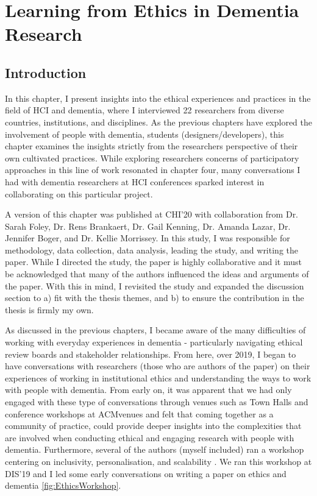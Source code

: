 \chapter{Learning from Ethics in Dementia Research}
\label{EthicsChapter}

\section{Introduction}
\label{Ethics:Intro}
In this chapter, I present insights into the ethical experiences and practices in the field of HCI and dementia, where I interviewed 22 researchers from diverse countries, institutions, and disciplines. As the previous chapters have explored the involvement of people with dementia, students (designers/developers), this chapter examines the insights strictly from the researchers perspective of their own cultivated practices. While exploring researchers concerns of participatory approaches in this line of work resonated in chapter four, many conversations I had with dementia researchers at HCI conferences sparked interest in collaborating on this particular project. 

A version of this chapter was published at CHI'20 \citep{hodge_relational_2020} with collaboration from  Dr. Sarah Foley, Dr. Rens Brankaert, Dr. Gail Kenning, Dr. Amanda Lazar, Dr. Jennifer Boger, and Dr. Kellie Morrissey. In this study, I was responsible for methodology, data collection, data analysis, leading the study, and writing the paper. While I directed the study, the paper is highly collaborative and it must be acknowledged that many of the authors influenced the ideas and arguments of the paper. With this in mind, I revisited the study and expanded the discussion section to a) fit with the thesis themes, and b) to ensure the contribution in the thesis is firmly my own.

As discussed in the previous chapters, I became aware of the many difficulties of working with everyday experiences in dementia - particularly navigating ethical review boards and stakeholder relationships. From here, over 2019, I began to have  conversations with researchers (those who are authors of the paper) on their experiences of working in institutional ethics and understanding the ways to work with people with dementia. From early on, it was apparent that we had only engaged with these type of conversations through venues such as Town Halls \citep{munteanu_sigchi_2019,bruckman_cscw_2017,frauenberger_research_2017} and conference workshops at ACMvenues \citep{waycott_ethical_2015,lazar_hcixdementia_2018} and felt that coming together as a community of practice, could provide deeper insights into the complexities that are involved when conducting ethical and engaging research with people with dementia. Furthermore, several of the authors (myself included) ran a workshop centering on inclusivity, personalisation, and scalability \citep{brankaert_intersections_2019}. We ran this workshop at DIS'19 and I led some early conversations on writing a paper on ethics and dementia \ref{fig:EthicsWorkshop}. 

